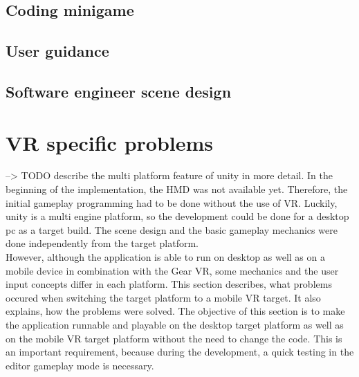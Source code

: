 \subsection{Coding minigame}
\subsection{User guidance}

\subsection{Software engineer scene design}
\section{VR specific problems}
--> TODO describe the multi platform feature of unity in more detail.
In the beginning of the implementation, the HMD was not available yet. Therefore, the initial gameplay programming had to be done without the use of VR. Luckily, unity is a multi engine platform, so the development could be done for a desktop pc as a target build. The scene design and the basic gameplay mechanics were done independently from the target platform. \\
However, although the application is able to run on desktop as well as on a mobile device in combination with the Gear VR, some mechanics and the user input concepts differ in each platform. This section describes, what problems occured when switching the target platform to a mobile VR target. It also explains, how the problems were solved. The objective of this section is to make the application runnable and playable on the desktop target platform as well as on the mobile VR target platform without the need to change the code. This is an important requirement, because during the development, a quick testing in the editor gameplay mode is necessary. 

